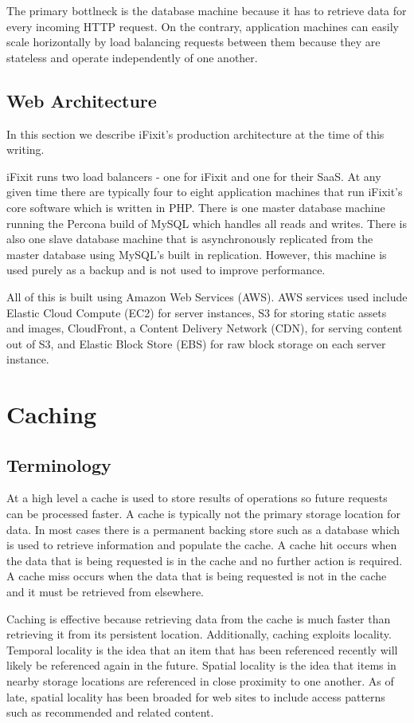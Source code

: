 \documentclass[12pt]{ucthesis}
\begin{document}
The primary bottlneck is the database machine because it has to retrieve data for every incoming HTTP request.
On the contrary, application machines can easily scale horizontally by load balancing requests between them because they are stateless and operate independently of one another.

\subsection{Web Architecture}
In this section we describe iFixit's production architecture at the time of this writing.

iFixit runs two load balancers - one for iFixit and one for their SaaS.
At any given time there are typically four to eight application machines that run iFixit's core software which is written in PHP.
There is one master database machine running the Percona build of MySQL which handles all reads and writes.
There is also one slave database machine that is asynchronously replicated from the master database using MySQL's built in replication.
However, this machine is used purely as a backup and is not used to improve performance.

All of this is built using Amazon Web Services (AWS).
AWS services used include Elastic Cloud Compute (EC2) for server instances, S3 for storing static assets and images, CloudFront, a Content Delivery Network (CDN), for serving content out of S3, and Elastic Block Store (EBS) for raw block storage on each server instance.

\section{Caching}

\subsection{Terminology}
At a high level a cache is used to store results of operations so future requests can be processed faster.
A cache is typically not the primary storage location for data.
In most cases there is a permanent backing store such as a database which is used to retrieve information and populate the cache.
A cache hit occurs when the data that is being requested is in the cache and no further action is required.
A cache miss occurs when the data that is being requested is not in the cache and it must be retrieved from elsewhere.

Caching is effective because retrieving data from the cache is much faster than retrieving it from its persistent location.
Additionally, caching exploits locality.
Temporal locality is the idea that an item that has been referenced recently will likely be referenced again in the future.
Spatial locality is the idea that items in nearby storage locations are referenced in close proximity to one another.
As of late, spatial locality has been broaded for web sites to include access patterns such as recommended and related content.
\end{document}
